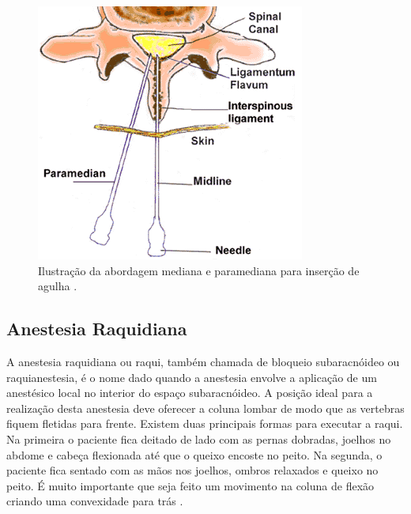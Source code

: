 \begin{figure}[ht!]
    \centering
    \includegraphics[width=0.6\linewidth]{capitulos/figuras/paramedian-midline-MedBroadcast-Tiff.png}
    \caption{Ilustração da abordagem mediana e paramediana para inserção de agulha \cite{MedBroadcast2018}.}
    \label{fig:abordagensInsercaoAgulha}
\end{figure}

\subsection{Anestesia Raquidiana} 
\label{sec:anestesiaRaquidiana}

A anestesia raquidiana  ou raqui, também chamada de bloqueio subaracnóideo ou  raquianestesia, é o nome dado quando a anestesia envolve a aplicação de um anestésico local no interior do espaço subaracnóideo. A posição ideal para a realização desta anestesia deve oferecer a coluna lombar de modo que as vertebras fiquem fletidas para frente. Existem duas principais formas para executar a raqui. Na primeira o paciente fica deitado de lado com as pernas dobradas, joelhos no abdome e cabeça flexionada até que o queixo encoste no peito. Na segunda, o paciente fica sentado com as mãos nos joelhos, ombros relaxados e queixo no peito. É muito importante que seja feito um movimento na coluna de flexão criando uma convexidade para trás \cite{Anesclin2019}.

